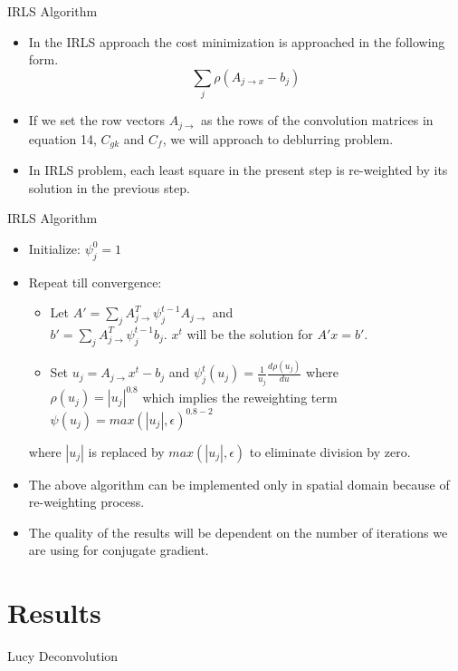 \documentclass{beamer}
\begin{document}
\begin{frame}{IRLS Algorithm}
  \begin{itemize}
  \item {
   In the IRLS approach the cost minimization is approached in the following form.
\begin{equation}
\sum_j\rho(A_{j \to x} - b_j)
\end{equation}  
  }
  \item {   
    If we set the row vectors $A_{j \to}$ as the rows of the convolution matrices in equation 14, $C_{gk}$ and $C_f$, we will approach to deblurring problem.
  }
  \item {
  	In IRLS problem, each least square in the present step is re-weighted by its solution in the previous step. 
  }
  \end{itemize}
\end{frame}

\begin{frame}{IRLS Algorithm}
  \begin{itemize}
\item Initialize: $\psi_j^0 = 1$
\item Repeat till convergence:
\begin{itemize}
\item Let $A' = \sum_jA_{j\to}^T\psi_j^{t-1}A_{j\to}$ and\\ $b' = \sum_jA_{j\to}^T\psi_j^{t-1}b_j$. $x^t$ will be the solution for $A'x = b'$.
\item Set $u_j = A_{j\to}x^t-b_j$ and $\psi_j^t(u_j) = \frac{1}{u_j}\frac{d\rho(u_j)}{du}$ where \\
 $\rho (u_j) = |u_j|^{0.8}$ which implies the reweighting term\\ $\psi (u_j) = max(|u_j|,\epsilon)^{0.8-2}$
\end{itemize}
where $|u_j|$ is replaced by $max(|u_j|,\epsilon)$ to eliminate division by zero. 
\item The above algorithm can be implemented only in spatial domain because of re-weighting process. 
\item The quality of the results will be dependent on the number of iterations we are using for conjugate gradient.
  \end{itemize}
\end{frame}

\section{Results}
\begin{frame}{Lucy Deconvolution}
\begin{figure}
\centering
{}
\label{fig:1}
\end{figure}
\end{frame}
\end{document}
